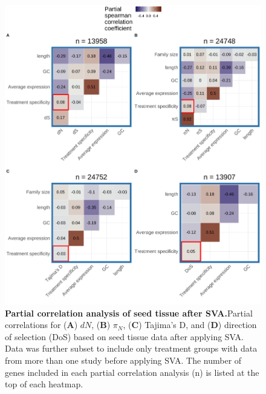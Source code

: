 \documentclass[12pt]{article}
\begin{document}
\begin{figure}[H]
\includegraphics[width=\linewidth, height=\textheight, keepaspectratio]{figures/appendix_a/partialCorrelations_withoutTissueSpecificityAfterSVA_seed_2023-02-21.pdf}
\caption{\textbf{Partial correlation analysis of seed tissue after SVA.}Partial correlations for (\textbf{A}) $dN$, (\textbf{B}) $\pi_N$, (\textbf{C}) Tajima's D, and (\textbf{D}) direction of selection (DoS) based on seed tissue data after applying SVA. Data was further subset to include only treatment groups with data from more than one study before applying SVA. The number of genes included in each partial correlation analysis (n) is listed at the top of each heatmap.}%
\end{figure}

\newpage
\end{document}
